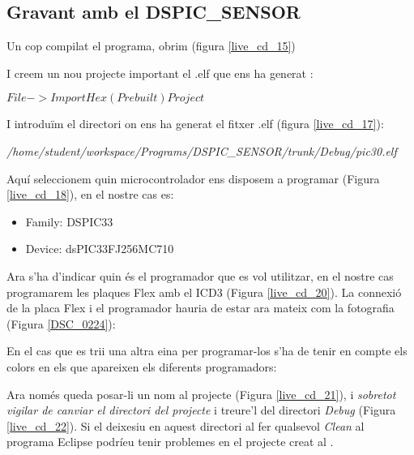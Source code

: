 \subsection{Gravant amb \MplabX  el DSPIC\_SENSOR}\label{cap:gui:cd:sav:sensor}

Un cop compilat el programa, obrim \MplabX (figura \ref{live_cd_15})

I creem un nou projecte important el .elf que ens ha generat \Eclipse:

$File->Import Hex (Prebuilt) Project$

I introduïm el directori on ens ha generat el fitxer .elf (figura \ref{live_cd_17}):

\emph{/home/student/workspace/Programs/DSPIC\_SENSOR/trunk/Debug/pic30.elf}


Aquí seleccionem quin microcontrolador ens disposem a programar (Figura \ref{live_cd_18}), en el nostre cas es:

\begin{itemize}
	\item Family: DSPIC33
	\item Device: dsPIC33FJ256MC710
\end{itemize}


Ara s'ha d'indicar quin és el programador que es vol utilitzar, en el nostre cas programarem les plaques Flex amb el ICD3 (Figura \ref{live_cd_20}).
La connexió de la placa Flex i el programador hauria de estar ara mateix com la fotografia (Figura \ref{DSC_0224}):


En el cas que es trii una altra eina per programar-los s'ha de tenir en compte els colors en els que apareixen els diferents programadors:



Ara només queda posar-li un nom al projecte (Figura \ref{live_cd_21}), i \emph{sobretot vigilar de canviar el directori del projecte} i treure'l del directori \emph{Debug} (Figura \ref{live_cd_22}). Si el deixesiu en aquest directori al fer qualsevol \emph{Clean} al programa Eclipse podríeu tenir problemes en el projecte creat al \MplabX.


